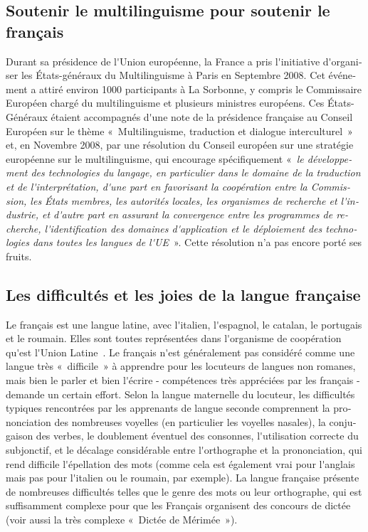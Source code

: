 \documentclass[]{../metanetpaper}
\begin{document}
\begin{french}
\begin{multicols}{2}
\subsection{Soutenir le multilinguisme pour soutenir le français}

Durant sa présidence de l{\mbox '}Union européenne, la France a pris
l{\mbox '}initiative d{\mbox '}organiser les États-généraux du
Multilinguisme à Paris en Septembre 2008. Cet événement a attiré
environ 1000 participants à La Sorbonne, y compris le Commissaire
Européen chargé du multilinguisme et plusieurs ministres
européens. Ces États-Généraux étaient accompagnés d{\mbox '}une note
de la présidence française au Conseil Européen sur le thème
«~Multilinguisme, traduction et dialogue interculturel~» et, en
Novembre 2008, par une résolution du Conseil européen sur une
stratégie européenne sur le multilinguisme, qui encourage
spécifiquement «~{\em le développement des technologies du langage, en
    particulier dans le domaine de la traduction et de l{\mbox
      '}interprétation, d{\mbox '}une part en favorisant la
    coopération entre la Commission, les États membres, les autorités
    locales, les organismes de recherche et l{\mbox '}industrie, et
    d{\mbox '}autre part en assurant la convergence entre les
    programmes de recherche, l{\mbox '}identification des domaines
    d{\mbox '}application et le déploiement des technologies dans
    toutes les langues de l{\mbox '}UE}~»\cite{eurlex}. Cette
résolution n'a pas encore porté ses fruits.

\subsection{Les difficultés et les joies de la langue française}

Le français est une langue latine, avec l{\mbox '}italien, l{\mbox
  '}espagnol, le catalan, le portugais et le roumain. Elles sont
toutes représentées dans l{\mbox '}organisme de coopération qu{\mbox
  '}est l{\mbox '}Union Latine~\cite{ulatine}. Le français n{\mbox
  '}est généralement pas considéré comme une langue très «~difficile~»
à apprendre pour les locuteurs de langues non romanes, mais bien le
parler et bien l{\mbox '}écrire - compétences très appréciées par les
français - demande un certain effort. Selon la langue maternelle du
locuteur, les difficultés typiques rencontrées par les apprenants de
langue seconde comprennent la prononciation des nombreuses voyelles
(en particulier les voyelles nasales), la conjugaison des verbes, le
doublement éventuel des consonnes, l{\mbox '}utilisation correcte du
subjonctif, et le décalage considérable entre l{\mbox '}orthographe et
la prononciation, qui rend difficile l{\mbox '}épellation des mots
(comme cela est également vrai pour l{\mbox '}anglais mais pas pour
l{\mbox '}italien ou le roumain, par exemple). La langue française
présente de nombreuses difficultés telles que le genre des mots ou
leur orthographe, qui est suffisamment complexe pour que les Français
organisent des concours de dictée (voir aussi la très complexe
«~Dictée de Mérimée~»).


\end{multicols}
\end{french}
\end{document}
